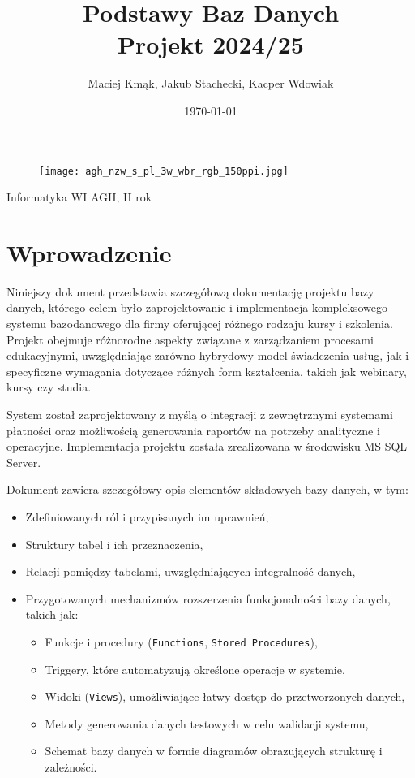 \documentclass[12pt]{article}
\title{%
  \textbf{\Huge Podstawy Baz Danych} \\ 
  \LARGE Projekt  2024/25}
\author{Maciej Kmąk, Jakub Stachecki, Kacper Wdowiak}
\date{\today}
\begin{document}
\begin{figure}
    \centering
    \texttt{[image: agh\_nzw\_s\_pl\_3w\_wbr\_rgb\_150ppi.jpg]}
    \label{fig:agh}
\end{figure}
\maketitle

{\centering \Large\theauthor\par}
{\centering
Informatyka WI AGH, II rok \\ } 

\thispagestyle{plain}

\newpage
\pagestyle{spis}
\small\tableofcontents

\newpage
\pagestyle{dokumentacja}
\section{Wprowadzenie}

Niniejszy dokument przedstawia szczegółową dokumentację projektu bazy danych, którego celem było zaprojektowanie i implementacja kompleksowego systemu bazodanowego dla firmy oferującej różnego rodzaju kursy i szkolenia. Projekt obejmuje różnorodne aspekty związane z zarządzaniem procesami edukacyjnymi, uwzględniając zarówno hybrydowy model świadczenia usług, jak i specyficzne wymagania dotyczące różnych form kształcenia, takich jak webinary, kursy czy studia.

\noindent System został zaprojektowany z myślą o integracji z zewnętrznymi systemami płatności oraz możliwością generowania raportów na potrzeby analityczne i operacyjne. Implementacja projektu została zrealizowana w środowisku MS SQL Server.

\noindent Dokument zawiera szczegółowy opis elementów składowych bazy danych, w tym: \begin{itemize} 
\item Zdefiniowanych ról i przypisanych im uprawnień, 
\item Struktury tabel i ich przeznaczenia, 
\item Relacji pomiędzy tabelami, uwzględniających integralność danych, 
\item Przygotowanych mechanizmów rozszerzenia funkcjonalności bazy danych, takich jak: \begin{itemize} 
        \item Funkcje i procedury (\texttt{Functions}, \texttt{Stored Procedures}),
        \item Triggery, które automatyzują określone operacje w systemie, 
        \item Widoki (\texttt{Views}), umożliwiające łatwy dostęp do przetworzonych danych, 
        \item Metody generowania danych testowych w celu walidacji systemu, 
        \item Schemat bazy danych w formie diagramów obrazujących strukturę i zależności. 
    \end{itemize} 
\end{itemize}
\end{document}

